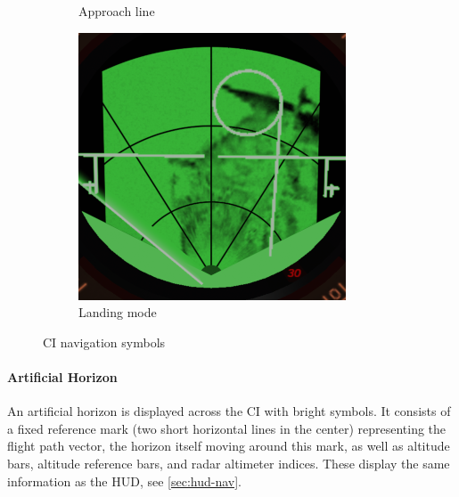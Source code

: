 \begin{figure}[!ht]
\begin{subfigure}[t]{0.3\textwidth}
    \caption{Approach line}
    \label{fig:CI-navigation-runway}
  \end{subfigure}
  \begin{subfigure}[t]{0.3\textwidth}
    \includegraphics[width=\textwidth]{images/displays/CI-landing.png}
    \caption{Landing mode}
    \label{fig:CI-navigation-landing}
  \end{subfigure}

  \caption{CI navigation symbols}
  \label{fig:CI-navigation}
\end{figure}

\paragraph{Artificial Horizon}
An artificial horizon is displayed across the CI with bright symbols.
It consists of a fixed reference mark (two short horizontal lines in the center) representing the flight path vector,
the horizon itself moving around this mark,
as well as altitude bars, altitude reference bars, and radar altimeter indices.
These display the same information as the HUD, see \cref{sec:hud-nav}.
